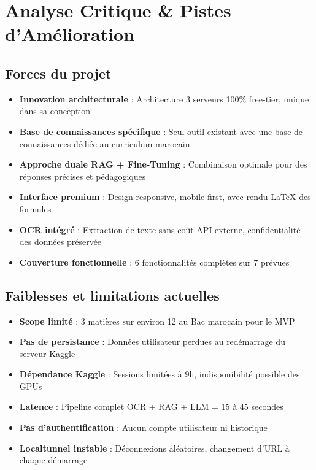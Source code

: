 \documentclass[12pt,a4paper]{report}
\begin{document}
\chapter{Analyse Critique \& Pistes d'Amélioration}

\section{Forces du projet}
\begin{itemize}
    \item \textbf{Innovation architecturale} : Architecture 3 serveurs 100\% free-tier, unique dans sa conception
    \item \textbf{Base de connaissances spécifique} : Seul outil existant avec une base de connaissances dédiée au curriculum marocain
    \item \textbf{Approche duale RAG + Fine-Tuning} : Combinaison optimale pour des réponses précises et pédagogiques
    \item \textbf{Interface premium} : Design responsive, mobile-first, avec rendu LaTeX des formules
    \item \textbf{OCR intégré} : Extraction de texte sans coût API externe, confidentialité des données préservée
    \item \textbf{Couverture fonctionnelle} : 6 fonctionnalités complètes sur 7 prévues
\end{itemize}

\section{Faiblesses et limitations actuelles}
\begin{itemize}
    \item \textbf{Scope limité} : 3 matières sur environ 12 au Bac marocain pour le MVP
    \item \textbf{Pas de persistance} : Données utilisateur perdues au redémarrage du serveur Kaggle
    \item \textbf{Dépendance Kaggle} : Sessions limitées à 9h, indisponibilité possible des GPUs
    \item \textbf{Latence} : Pipeline complet OCR + RAG + LLM = 15 à 45 secondes
    \item \textbf{Pas d'authentification} : Aucun compte utilisateur ni historique
    \item \textbf{Localtunnel instable} : Déconnexions aléatoires, changement d'URL à chaque démarrage
\end{itemize}
\end{document}
